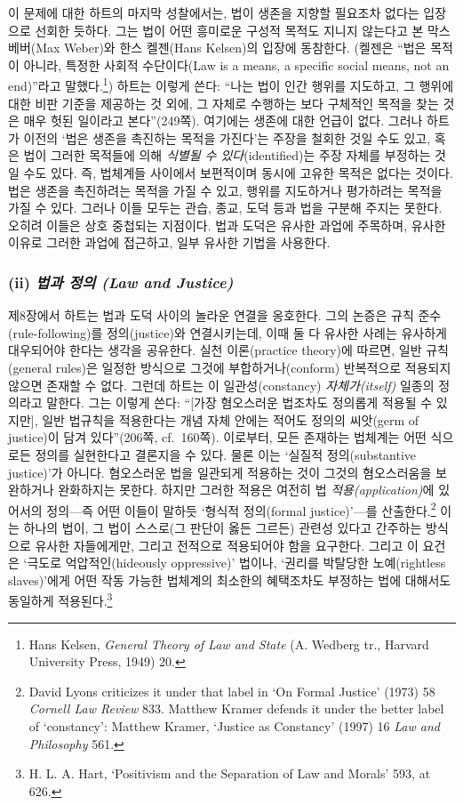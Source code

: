\documentclass[12pt, oneside]{book}  %
\begin{document}
이 문제에 대한 하트의 마지막 성찰에서는, 법이 생존을 지향할 필요조차
없다는 입장으로 선회한 듯하다. 그는 법이 어떤 흥미로운 구성적 목적도
지니지 않는다고 본 막스 베버(Max Weber)와 한스 켈젠(Hans Kelsen)의
입장에 동참한다. (켈젠은 ``법은 목적이 아니라, 특정한 사회적
수단이다(Law is a means, a specific social means, not an end)''라고
말했다.\footnote{Hans Kelsen, \emph{General Theory of Law and State} (A.
  Wedberg tr., Harvard University Press, 1949) 20.}) 하트는 이렇게 쓴다:
``나는 법이 인간 행위를 지도하고, 그 행위에 대한 비판 기준을 제공하는 것
외에, 그 자체로 수행하는 보다 구체적인 목적을 찾는 것은 매우 헛된
일이라고 본다''(249쪽). 여기에는 생존에 대한 언급이 없다. 그러나 하트가
이전의 `법은 생존을 촉진하는 목적을 가진다'는 주장을 철회한 것일 수도
있고, 혹은 법이 그러한 목적들에 의해 \emph{식별될 수 있다}(identified)는
주장 자체를 부정하는 것일 수도 있다. 즉, 법체계들 사이에서 보편적이며
동시에 고유한 목적은 없다는 것이다. 법은 생존을 촉진하려는 목적을 가질
수 있고, 행위를 지도하거나 평가하려는 목적을 가질 수 있다. 그러나 이들
모두는 관습, 종교, 도덕 등과 법을 구분해 주지는 못한다. 오히려 이들은
상호 중첩되는 지점이다. 법과 도덕은 유사한 과업에 주목하며, 유사한
이유로 그러한 과업에 접근하고, 일부 유사한 기법을 사용한다.

\subsubsection{\texorpdfstring{(ii) \emph{법과 정의 (Law and
Justice)}}{(ii) 법과 정의 (Law and Justice)}}\label{ii-uxbc95uxacfc-uxc815uxc758-law-and-justice}

제8장에서 하트는 법과 도덕 사이의 놀라운 연결을 옹호한다. 그의 논증은
규칙 준수(rule-following)를 정의(justice)와 연결시키는데, 이때 둘 다
유사한 사례는 유사하게 대우되어야 한다는 생각을 공유한다. 실천
이론(practice theory)에 따르면, 일반 규칙(general rules)은 일정한
방식으로 그것에 부합하거나(conform) 반복적으로 적용되지 않으면 존재할 수
없다. 그런데 하트는 이 일관성(constancy) \emph{자체가(itself)} 일종의
정의라고 말한다. 그는 이렇게 쓴다: ``{[}가장 혐오스러운 법조차도
정의롭게 적용될 수 있지만{]}, 일반 법규칙을 적용한다는 개념 자체 안에는
적어도 정의의 씨앗(germ of justice)이 담겨 있다''(206쪽, cf.~160쪽).
이로부터, 모든 존재하는 법체계는 어떤 식으로든 정의를 실현한다고
결론지을 수 있다. 물론 이는 `실질적 정의(substantive justice)'가 아니다.
혐오스러운 법을 일관되게 적용하는 것이 그것의 혐오스러움을 보완하거나
완화하지는 못한다. 하지만 그러한 적용은 여전히 법
\emph{적용(application)}에 있어서의 정의---즉 어떤 이들이 말하듯 `형식적
정의(formal justice)'---를 산출한다.\footnote{David Lyons criticizes it
  under that label in `On Formal Justice' (1973) 58 \emph{Cornell Law
  Review} 833. Matthew Kramer defends it under the better label of
  `constancy': Matthew Kramer, `Justice as Constancy' (1997) 16
  \emph{Law and Philosophy} 561.} 이는 하나의 법이, 그 법이 스스로(그
판단이 옳든 그르든) 관련성 있다고 간주하는 방식으로 유사한 자들에게만,
그리고 전적으로 적용되어야 함을 요구한다. 그리고 이 요건은 `극도로
억압적인(hideously oppressive)' 법이나, `권리를 박탈당한 노예(rightless
slaves)'에게 어떤 작동 가능한 법체계의 최소한의 혜택조차도 부정하는 법에
대해서도 동일하게 적용된다.\footnote{H. L. A. Hart, `Positivism and the
  Separation of Law and Morals' 593, at 626.}
\end{document}
